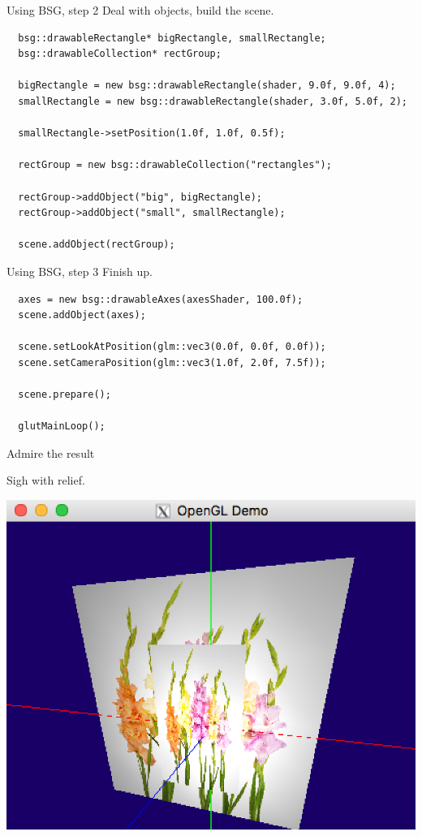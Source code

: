 \documentclass[12pt]{article}
\begin{document}
\begin{frame}[fragile]{Using BSG, step 2}
Deal with objects, build the scene.

\begin{verbatim}
  bsg::drawableRectangle* bigRectangle, smallRectangle;
  bsg::drawableCollection* rectGroup;

  bigRectangle = new bsg::drawableRectangle(shader, 9.0f, 9.0f, 4);
  smallRectangle = new bsg::drawableRectangle(shader, 3.0f, 5.0f, 2);

  smallRectangle->setPosition(1.0f, 1.0f, 0.5f);

  rectGroup = new bsg::drawableCollection("rectangles");

  rectGroup->addObject("big", bigRectangle);
  rectGroup->addObject("small", smallRectangle);

  scene.addObject(rectGroup);

\end{verbatim}
\end{frame}

\begin{frame}[fragile]{Using BSG, step 3}
Finish up.

\begin{verbatim}
  axes = new bsg::drawableAxes(axesShader, 100.0f);
  scene.addObject(axes);

  scene.setLookAtPosition(glm::vec3(0.0f, 0.0f, 0.0f));
  scene.setCameraPosition(glm::vec3(1.0f, 2.0f, 7.5f));

  scene.prepare();

  glutMainLoop();
\end{verbatim}
\end{frame}


\begin{frame}{Admire the result}

Sigh with relief.
\begin{center}
\includegraphics[width=0.6\columnwidth]{images/treeDemo2.png}
\end{center}

\end{frame}
\end{document}

